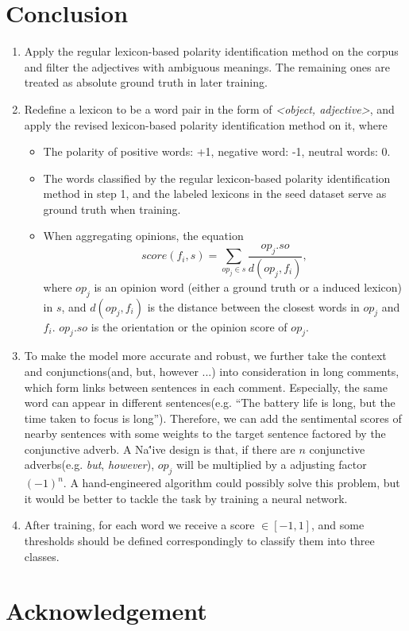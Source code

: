 \documentclass[12pt,a4paper]{article}
\theoremstyle{definition}
\begin{document}
\section{Conclusion}
\begin{enumerate}
	\item Apply the regular lexicon-based polarity identification method on the corpus and filter the adjectives with ambiguous meanings. The remaining ones are treated as absolute ground truth in later training.
	\item Redefine a lexicon to be a word pair in the form of \emph{<object, adjective>},
and apply the revised lexicon-based polarity identification method on it, where
\begin{itemize}
	\item The polarity of positive words: +1, negative word: -1, neutral words: 0.
	\item The words classified by the regular lexicon-based polarity identification method in step 1, and the labeled lexicons in the seed dataset serve as ground truth when training. 
	\item When aggregating opinions, the equation
	\begin{equation}
		score(f_i, s) = \sum_{op_j \in s} \frac{op_{j}.so}{d(op_j, f_i)},
	\end{equation}
	where $op_j$ is an opinion word (either a ground truth or a induced lexicon) in $s$, and $d(op_j, f_i)$ is the distance between the closest words in $op_j$ and $f_i$. $op_{j}.so$ is the orientation or the opinion score of $op_j$. 
\end{itemize}
	\item To make the model more accurate and robust, we further take the context and conjunctions(and, but, however ...) into consideration in long comments, which form links between sentences in each comment. Especially, the same word can appear in different sentences(e.g. ``The battery life is long, but the time taken to focus is long''). Therefore, we can add the sentimental scores of nearby sentences with some weights to the target sentence factored by the conjunctive adverb. A Na\''{i}ve design is that, if there are $n$ conjunctive adverbs(e.g. \emph{but}, \emph{however}), $op_j$ will be multiplied by a adjusting factor ${(-1)}^{n}$. A hand-engineered algorithm could possibly solve this problem, but it would be better to tackle the task by training a neural network.
	\item After training, for each word we receive a score $\in [-1, 1]$, and some thresholds should be defined correspondingly to classify them into three classes.
\end{enumerate}

\section{Acknowledgement}

\renewcommand{\refname}{References}


\end{document}
